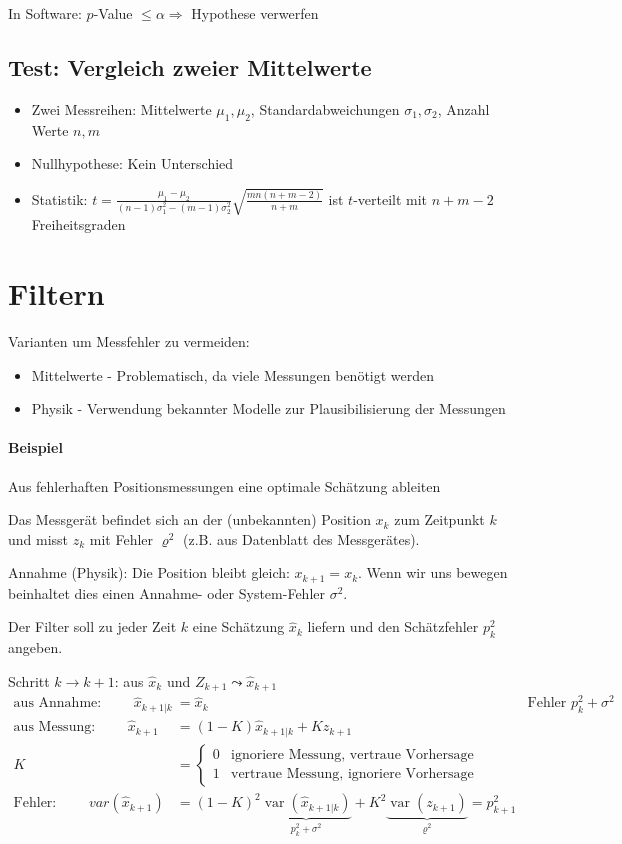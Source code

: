 \documentclass[10pt,a4paper]{scrartcl}
\DeclareMathOperator{\var}{var}
\begin{document}
In Software: $p$-Value $\le \alpha \Rightarrow$ Hypothese verwerfen 

\subsection{Test: Vergleich zweier Mittelwerte}
\begin{itemize}
\item Zwei Messreihen: Mittelwerte $\mu_1, \mu_2$, Standardabweichungen $\sigma_1, \sigma_2$, Anzahl Werte $n, m$
\item Nullhypothese: Kein Unterschied
\item Statistik: $t = \frac{\mu_1 - \mu_2}{(n-1)\sigma_1^2 - (m-1)\sigma_2^2} \sqrt{\frac{mn(n+m-2)}{n+m}}$ ist $t$-verteilt mit $n+m-2$ Freiheitsgraden
\end{itemize}

\section{Filtern}

Varianten um Messfehler zu vermeiden:
\begin{itemize}
\item Mittelwerte - Problematisch, da viele Messungen benötigt werden
\item Physik - Verwendung bekannter Modelle zur Plausibilisierung der Messungen
\end{itemize}

\paragraph{Beispiel} Aus fehlerhaften Positionsmessungen eine optimale Schätzung ableiten

Das Messgerät befindet sich an der (unbekannten) Position $x_k$ zum Zeitpunkt $k$ und misst $z_k$ mit Fehler $\varrho^2$ (z.B. aus Datenblatt des Messgerätes).

Annahme (Physik): Die Position bleibt gleich: $x_{k+1} = x_k$. Wenn wir uns bewegen beinhaltet dies einen Annahme- oder System-Fehler $\sigma^2$.

Der Filter soll zu jeder Zeit $k$ eine Schätzung $\hat{x}_k$ liefern und den Schätzfehler $p_k^2$ angeben.

Schritt $k\to k+1$: aus $\hat{x}_k$ und $Z_{k+1} \leadsto \hat{x}_{k+1}$ 
\begin{align*}
\text{aus Annahme: } \qquad \hat{x}_{k+1|k} &= \hat{x}_k & \text{Fehler } p_k^2 + \sigma^2 \\
\text{aus Messung: } \qquad \hat{x}_{k+1} &= (1-K) \hat{x}_{k+1|k} + Kz_{k+1} \\
   K &= \begin{cases} 0& \text{ignoriere Messung, vertraue Vorhersage}\\1 &\text{vertraue Messung, ignoriere Vorhersage} \end{cases}\\
\text{Fehler: } \qquad var(\hat{x}_{k+1}) &= (1-K)^2 \underbrace{\var(\hat{x}_{k+1|k})}_{p_k^2 + \sigma^2} + K^2 \underbrace{\var(z_{k+1})}_{\varrho^2} = p_{k+1}^2
\end{align*}
\end{document}
